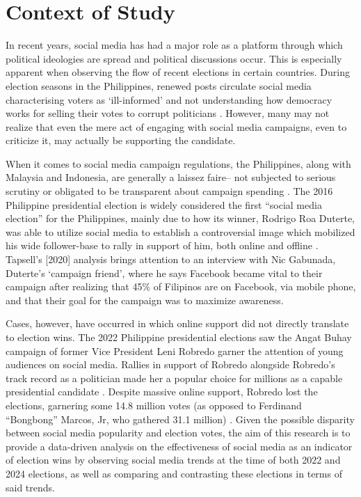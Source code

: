 
\section{Context of Study}
In recent years, social media has had a major role as a platform through which political ideologies are spread and political discussions occur. This is especially apparent when observing the flow of recent elections in certain countries. During election seasons in the Philippines, renewed posts circulate social media characterising voters as ‘ill-informed’ and not understanding how democracy works for selling their votes to corrupt politicians \cite{CTX_Calimbahin-2023}. However, many may not realize that even the mere act of engaging with social media campaigns, even to criticize it, may actually be supporting the candidate.

When it comes to social media campaign regulations, the Philippines, along with Malaysia and Indonesia, are generally a laissez faire– not subjected to serious scrutiny or obligated to be transparent about campaign spending \cite{RRL_Tapsell-2020}. The 2016 Philippine presidential election is widely considered the first “social media election” for the Philippines, mainly due to how its winner, Rodrigo Roa Duterte, was able to utilize social media to establish a controversial image which mobilized his wide follower-base to rally in support of him, both online and offline \cite{RRL_Sinpeng-2020}. Tapsell’s [2020] analysis brings attention to an interview with Nic Gabunada, Duterte’s ‘campaign friend’, where he says Facebook became vital to their campaign after realizing that 45\% of Filipinos are on Facebook, via mobile phone, and that their goal for the campaign was to maximize awareness.

Cases, however, have occurred in which online support did not directly translate to election wins. The 2022 Philippine presidential elections saw the Angat Buhay campaign of former Vice President Leni Robredo garner the attention of young audiences on social media. Rallies in support of Robredo alongside Robredo’s track record as a politician made her a popular choice for millions as a capable presidential candidate \cite{CTX_Johnson-2022}. Despite massive online support, Robredo lost the elections, garnering some 14.8 million votes (as opposed to Ferdinand “Bongbong” Marcos, Jr, who gathered 31.1 million) \cite{CTX_ABSCBN-2022}. Given the possible disparity between social media popularity and election votes, the aim of this research is to provide a data-driven analysis on the effectiveness of social media as an indicator of election wins by observing social media trends at the time of both 2022 and 2024 elections, as well as comparing and contrasting these elections in terms of said trends.


